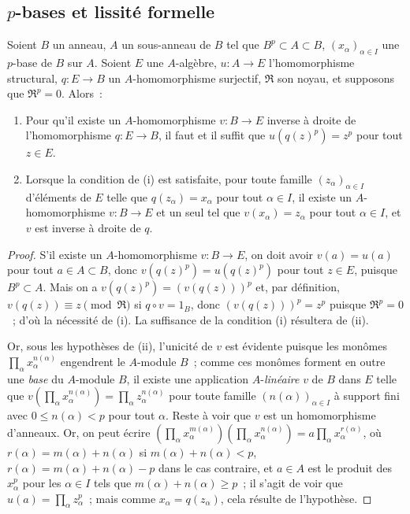\subsection{$p$-bases et lissité formelle}
\label{0.21.2-fr}

\begin{theorem}[21.2.1]
\label{0.21.2.1-fr}
Soient $B$ un anneau, $A$ un sous-anneau de $B$ tel que $B^p\subset A\subset B$,
$(x_\alpha)_{\alpha\in I}$ une $p$-base de $B$ sur $A$.
Soient $E$ une $A$-algèbre, $u:A\to E$ l'homomorphisme structural,
$q:E\to B$ un $A$-homomorphisme surjectif, $\mathfrak R$ son noyau, et
supposons que $\mathfrak R^p=0$. Alors~:
\begin{enumerate}
  \item[(i)] Pour qu'il existe un $A$-homomorphisme $v:B\to E$ inverse à
  droite de l'homomorphisme $q:E\to B$, il faut et il suffit que
  $u(q(z)^p)=z^p$ pour tout $z\in E$.
  \item[(ii)] Lorsque la condition de (i) est satisfaite, pour toute famille
  $(z_\alpha)_{\alpha\in I}$ d'éléments de $E$ telle que
  $q(z_\alpha)=x_\alpha$ pour tout $\alpha\in I$, il existe un
  $A$-homomorphisme $v:B\to E$ et un seul tel que $v(x_\alpha)=z_\alpha$
  pour tout $\alpha\in I$, et $v$ est inverse à droite de $q$.
\end{enumerate}
\end{theorem}

\begin{proof}
S'il existe un $A$-homomorphisme $v:B\to E$, on doit avoir $v(a)=u(a)$ pour
tout $a\in A\subset B$, donc $v(q(z)^p)=u(q(z)^p)$ pour tout $z\in E$,
puisque $B^p\subset A$. Mais on a $v(q(z)^p)=(v(q(z)))^p$ et, par définition,
$v(q(z))\equiv z\pmod{\mathfrak R}$ si $q\circ v=1_B$, donc
$(v(q(z)))^p=z^p$ puisque $\mathfrak R^p=0$~; d'où la nécessité de (i).
La suffisance de la condition (i) résultera de (ii).

Or, sous les hypothèses de (ii), l'unicité de $v$ est évidente puisque les
monômes $\prod_\alpha x_\alpha^{n(\alpha)}$ engendrent le $A$-module $B$~;
comme ces monômes forment en outre une \emph{base} du $A$-module $B$, il existe
une application $A$-\emph{linéaire} $v$ de $B$ dans $E$ telle que
$v(\prod_\alpha x_\alpha^{n(\alpha)})=\prod_\alpha z_\alpha^{n(\alpha)}$
pour toute famille $(n(\alpha))_{\alpha\in I}$ à support fini avec
$0\leq n(\alpha)<p$ pour tout $\alpha$. Reste à voir que $v$ est un
homomorphisme d'anneaux. Or, on peut écrire
$(\prod_\alpha x_\alpha^{m(\alpha)})(\prod_\alpha x_\alpha^{n(\alpha)})
=a\prod_\alpha x_\alpha^{r(\alpha)}$, où
$r(\alpha)=m(\alpha)+n(\alpha)$ si $m(\alpha)+n(\alpha)<p$,
$r(\alpha)=m(\alpha)+n(\alpha)-p$ dans le cas contraire, et $a\in A$
est le produit des $x_\alpha^p$ pour les $\alpha\in I$ tels que
$m(\alpha)+n(\alpha)\geq p$~; il s'agit de voir que
$u(a)=\prod_\alpha z_\alpha^p$~; mais comme $x_\alpha=q(z_\alpha)$, cela
résulte de l'hypothèse.
\end{proof}

